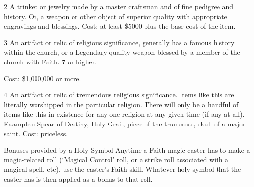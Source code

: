 \documentclass[twoside]{book}
\begin{document}
                  
                   2   
                     A trinket or jewelry made by a master
                     craftsman and of fine pedigree and history. Or, a
                     weapon or other object of superior quality with
                     appropriate engravings and blessings. 
                     Cost: at least \$5000 plus the base cost of the
                     item. 
                  
                  
                   3   
                     An artifact or relic of religious
                     significance, generally has a famous history within
                     the church, or a Legendary quality weapon blessed by
                     a member of the church with Faith: 7 or higher.
                     
                   Cost: \$1,000,000 or more.   
                  
                  
                   4   
                     An artifact or relic of tremendous religious
                     significance. Items like this are literally
                     worshipped in the particular religion. There will
                     only be a handful of items like this in existence
                     for any one religion at any given time (if any at
                     all). Examples: Spear of Destiny, Holy Grail, piece
                     of the true cross, skull of a major saint. 
                   Cost: priceless.   
                  
                
              Bonuses provided by a Holy Symbol  
              Anytime a Faith magic caster has to make a
               magic-related roll (`Magical Control' roll, or
               a strike roll associated with a magical spell, etc), use
               the caster's Faith skill. Whatever holy symbol that
               the caster has is then applied as a bonus to that roll.
               
\end{document}

